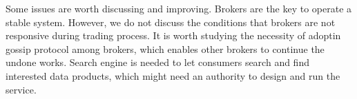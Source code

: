 \documentclass[conference]{IEEEtran}
\begin{document}
Some issues are worth discussing and improving. Brokers are the key to operate a stable system. However, we do not discuss the conditions that brokers are not responsive during trading process. It is worth studying the necessity of adoptin gossip protocol among brokers, which enables other brokers to continue the undone works. Search engine is needed to let consumers search and find interested data products, which might need an authority to design and run the service. 



\end{document}
